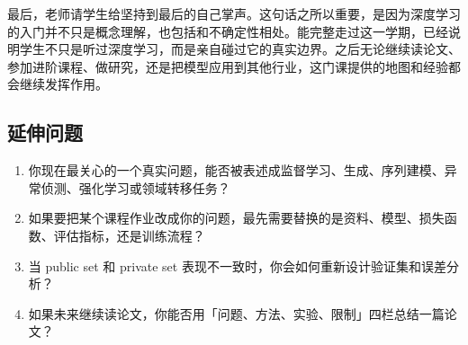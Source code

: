 \documentclass[a4paper]{article}
\begin{document}
最后，老师请学生给坚持到最后的自己掌声。这句话之所以重要，是因为深度学习的入门并不只是概念理解，也包括和不确定性相处。能完整走过这一学期，已经说明学生不只是听过深度学习，而是亲自碰过它的真实边界。之后无论继续读论文、参加进阶课程、做研究，还是把模型应用到其他行业，这门课提供的地图和经验都会继续发挥作用。

\subsection{延伸问题}

\begin{enumerate}
    \item 你现在最关心的一个真实问题，能否被表述成监督学习、生成、序列建模、异常侦测、强化学习或领域转移任务？
    \item 如果要把某个课程作业改成你的问题，最先需要替换的是资料、模型、损失函数、评估指标，还是训练流程？
    \item 当 public set 和 private set 表现不一致时，你会如何重新设计验证集和误差分析？
    \item 如果未来继续读论文，你能否用「问题、方法、实验、限制」四栏总结一篇论文？
\end{enumerate}
\end{document}
